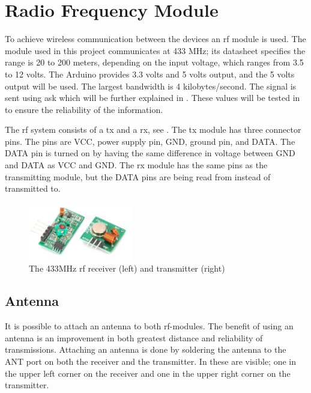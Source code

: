 \section{Radio Frequency Module} \label{rfmodule}
To achieve wireless communication between the devices an \gls{rf} module is used.
The module used in this project communicates at 433 MHz; its datasheet specifies the range is 20 to 200 meters, depending on the input voltage, which ranges from 3.5 to 12 volts. 
The Arduino provides 3.3 volts and 5 volts output, and the 5 volts output will be used.
The largest bandwidth is 4 kilobytes/second. 
The signal is sent using \gls{ask} which will be further explained in .
These values will be tested in  to ensure the reliability of the information. 

\bigskip \noindent
The \gls{rf} system consists of a \gls{tx} and a \gls{rx}, see .
The \gls{tx} module has three connector pins.
The pins are VCC, power supply pin, GND, ground pin, and DATA.
The DATA pin is turned on by having the same difference in voltage between GND and DATA as VCC and GND. 
The \gls{rx} module has the same pins as the transmitting module, but the DATA pins are being read from instead of transmitted to.

\begin{figure}[h] 
\vspace{-5pt} 
\centering
\includegraphics[width=0.4\textwidth]{Figures/arduino_rf.jpg}
\vspace{-5pt} 
\caption{The 433MHz \gls{rf} receiver (left) and transmitter (right)}
\label{fig:arduino_rf}
\vspace{-5pt}    
\end{figure}

\subsection{Antenna}
It is possible to attach an antenna to both \gls{rf}-modules. 
The benefit of using an antenna is an improvement in both greatest distance and reliability of transmissions.
Attaching an antenna is done by soldering the antenna to the ANT port on both the receiver and the transmitter. 
In  these are visible; one in the upper left corner on the receiver and one in the upper right corner on the transmitter. 

